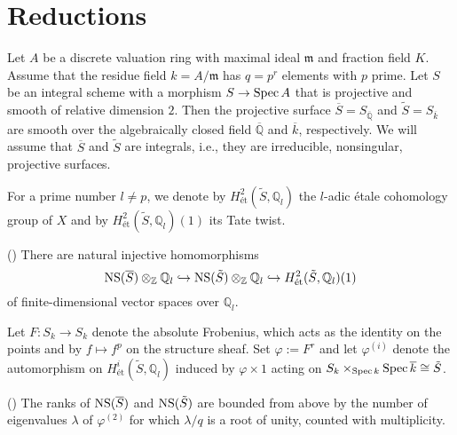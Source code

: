\documentclass[main]{subfiles}
\begin{document}
\section{Reductions}
\label{sec:reduction}

Let $A$ be a discrete valuation ring with maximal ideal $\mathfrak{m}$ and fraction field $K$.
Assume that the residue field $k=A/\mathfrak{m}$ has $q=p^r$ elements with $p$ prime.
Let $S$ be an integral scheme with a morphism $S \to \operatorname{Spec} A$ that is projective and smooth of relative dimension $2$.
Then the projective surface $\overline{S}=S_{\overline{\mathbb{Q}}}$ and $\tilde{S}=S_{\overline{k}}$ are smooth over the algebraically closed field $\overline{\mathbb{Q}}$ and $\overline{k}$, respectively.
We will assume that $\overline{S}$ and $\tilde{S}$ are integrals, i.e., they are irreducible, nonsingular, projective surfaces.

For a prime number $l \neq p$, we denote by $H_{\text{\'et}}^{2}(\tilde{S}, \mathbb{Q}_l)$ the $l$-adic \'etale cohomology group of $X$ and by $H_{\text{\'et}}^{2}(\tilde{S}, \mathbb{Q}_l)(1)$ its Tate twist.

\begin{thm}{(\cite[Proposition 6.2.]{ref:vanluijk2007})}
    There are natural injective homomorphisms
    \begin{equation*}
        \operatorname{NS} (\overline{S}) \otimes_{\mathbb{Z}} \mathbb{Q}_{l} \hookrightarrow \operatorname{NS} (\tilde{S}) \otimes_{\mathbb{Z}} \mathbb{Q}_{l} \hookrightarrow H_{\text{\'et}}^{2}(\tilde{S}, \mathbb{Q}_{l})(1)
    \end{equation*}
    of finite-dimensional vector spaces over $\mathbb{Q}_l$.
\end{thm}

Let $F: S_k \to S_k$ denote the absolute Frobenius, which acts as the identity on the points and by $f \mapsto f^p$ on the structure sheaf.
Set $\varphi:=F^{r}$ and let $\varphi^{(i)}$ denote the automorphism on $H_{\text{\'et}}^{i}(\tilde{S}, \mathbb{Q}_l)$ induced by $\varphi \times 1$ acting on $S_k \times_{\operatorname{Spec} k} \operatorname{Spec} \overline{k} \cong \tilde{S}$.

\begin{cor}{(\cite[Corollary 6.4.]{ref:vanluijk2007})}
    \label{cor:ns_upper_bound}
    The ranks of $\operatorname{NS} (\overline{S})$ and $\operatorname{NS} (\tilde{S})$ are bounded from above by the number of eigenvalues $\lambda$ of $\varphi^{(2)}$ for which $\lambda/q$ is a root of unity, counted with multiplicity.
\end{cor}
\end{document}
